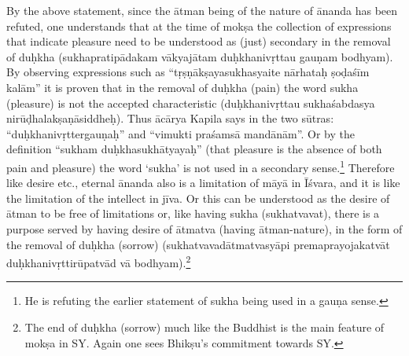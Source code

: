 By the above statement, since the ātman being of the nature of ānanda has been refuted, one understands that at the time of mokṣa the collection of expressions that indicate pleasure need to be understood as (just) secondary in the removal of duḥkha (sukhapratipādakam vākyajātam duḥkhanivṛttau gauṇam bodhyam). By observing expressions such as “tṛṣṇākṣayasukhasyaite nārhataḥ ṣoḍaśīm kalām” it is proven that in the removal of duḥkha (pain) the word sukha (pleasure) is not the accepted characteristic (duḥkhanivṛttau sukhaśabdasya nirūḍhalakṣaṇāsiddheḥ). Thus ācārya Kapila says in the two sūtras: “duḥkhanivṛttergauṇaḥ” and “vimukti praśamsā mandānām”. Or by the definition “sukham duḥkhasukhātyayaḥ” (that pleasure is the absence of both pain and pleasure) the word ‘sukha’ is not used in a secondary sense.\footnote{He is refuting the earlier statement of sukha being used in a gauṇa sense.} Therefore like desire etc., eternal ānanda also is a limitation of māyā in Īśvara, and it is like the limitation of the intellect in jīva. Or this can be understood as the desire of ātman to be free of limitations or, like having sukha (sukhatvavat), there is a purpose served by having desire of ātmatva (having ātman-nature), in the form of the removal of duḥkha (sorrow) (sukhatvavadātmatvasyāpi premaprayojakatvāt duḥkhanivṛttirūpatvād vā bodhyam).\footnote{The end of duḥkha (sorrow) much like the Buddhist is the main feature of mokṣa in SY. Again one sees Bhikṣu’s commitment towards SY.} 



